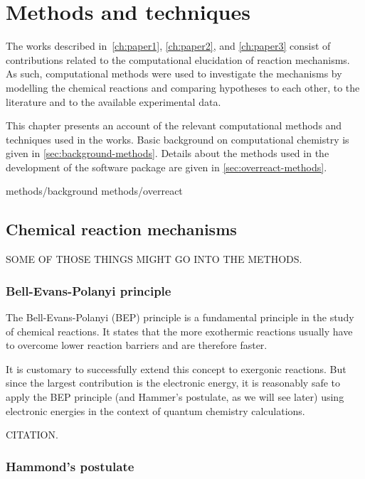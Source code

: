\chapter{Methods and techniques}%
\label{ch:methods}

The works described in~\autoref{ch:paper1}, \autoref{ch:paper2}, and
\autoref{ch:paper3} consist of contributions related to the computational
elucidation of reaction mechanisms.
As such, computational methods were used to investigate the mechanisms by
modelling the chemical reactions and comparing hypotheses to each other,
to the literature and to the available experimental data.

This chapter presents an account of the relevant computational methods and
techniques used in the works.
Basic background on computational chemistry is given in
\autoref{sec:background-methods}.
Details about the methods used in the development of the \overreact software
package are given in \autoref{sec:overreact-methods}.

{methods/background}
{methods/overreact}

\section{Chemical reaction mechanisms}

SOME OF THOSE THINGS MIGHT GO INTO THE METHODS.

\subsection{Bell-Evans-Polanyi principle}

The Bell-Evans-Polanyi (BEP) principle is a fundamental principle in the study
of chemical reactions.
It states that the more exothermic reactions usually have to overcome lower
reaction barriers and are therefore faster.

It is customary to successfully extend this concept to exergonic reactions.
But since the largest contribution is the electronic energy, it is reasonably
safe to apply the BEP principle (and Hammer's postulate, as we will see later)
using electronic energies in the context of quantum chemistry calculations.

CITATION.

\subsection{Hammond's postulate}

